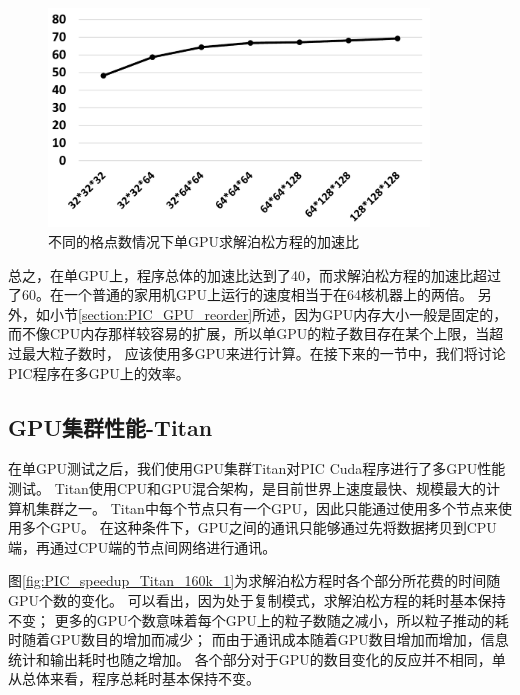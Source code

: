 \begin{figure}[!htb]
  \centering
  \includegraphics[width=0.9\textwidth]{Img/PIC_speedup_1GPU_Poisson.pdf}
  \caption{不同的格点数情况下单GPU求解泊松方程的加速比}
  \label{fig:PIC_speedup_1GPU_Poisson}
\end{figure}

总之，在单GPU上，程序总体的加速比达到了40，而求解泊松方程的加速比超过了60。在一个普通的家用机GPU上运行的速度相当于在64核机器上的两倍。
另外，如小节\ref{section:PIC_GPU_reorder}所述，因为GPU内存大小一般是固定的，
而不像CPU内存那样较容易的扩展，所以单GPU的粒子数目存在某个上限，当超过最大粒子数时，
应该使用多GPU来进行计算。在接下来的一节中，我们将讨论PIC程序在多GPU上的效率。

\subsection{GPU集群性能-Titan}
在单GPU测试之后，我们使用GPU集群Titan对PIC Cuda程序进行了多GPU性能测试。
Titan使用CPU和GPU混合架构，是目前世界上速度最快、规模最大的计算机集群之一。
Titan中每个节点只有一个GPU，因此只能通过使用多个节点来使用多个GPU。
在这种条件下，GPU之间的通讯只能够通过先将数据拷贝到CPU端，再通过CPU端的节点间网络进行通讯。

图\ref{fig:PIC_speedup_Titan_160k_1}为求解泊松方程时各个部分所花费的时间随GPU个数的变化。
可以看出，因为处于复制模式，求解泊松方程的耗时基本保持不变；
更多的GPU个数意味着每个GPU上的粒子数随之减小，所以粒子推动的耗时随着GPU数目的增加而减少；
而由于通讯成本随着GPU数目增加而增加，信息统计和输出耗时也随之增加。
各个部分对于GPU的数目变化的反应并不相同，单从总体来看，程序总耗时基本保持不变。

